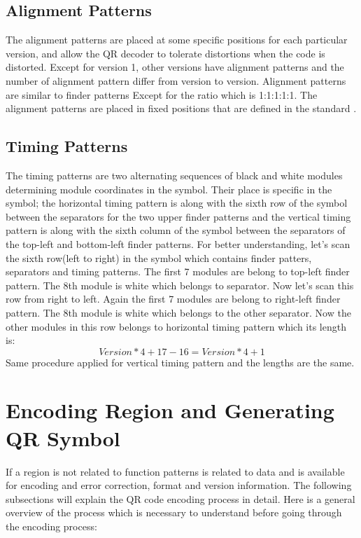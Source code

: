 \subsection{Alignment Patterns}

The alignment patterns are placed at some specific positions for each particular version, and allow the QR decoder to tolerate distortions when the code is distorted. Except for version 1, other versions have alignment patterns and the number of alignment pattern differ from version to version. Alignment patterns are similar to finder patterns Except for the ratio which is 1:1:1:1:1. The alignment patterns are placed in fixed positions that are defined in the standard \cite{1iso}.

\subsection{Timing Patterns}

The timing patterns are two alternating sequences of black and white modules determining module coordinates in the symbol. Their place is specific in the symbol; the horizontal timing pattern is along with the sixth row of the symbol
between the separators for the two upper finder patterns and the vertical timing pattern is along with the sixth column of the symbol between the separators of the top-left and bottom-left finder patterns. For better understanding, let's scan the sixth row(left to right) in the symbol which contains finder patters, separators and timing patterns. The first 7 modules are belong to top-left finder pattern. The 8th module is white which belongs to separator. Now let's scan this row from right to left. Again the first 7 modules are belong to right-left finder pattern. The 8th module is white which belongs to the other separator. Now the other modules in this row belongs to horizontal timing pattern which its length is:
$$Version*4+17-16=Version*4+1$$
Same procedure applied for vertical timing pattern and the lengths are the same.

\section{Encoding Region and Generating QR Symbol}\label{Encod}

If a region is not related to function patterns is related to data and is available for encoding and error correction, format and version information. The following subsections will explain the QR code encoding process in detail. Here is a general overview of the process which is necessary to understand before going through the encoding process\cite{Thonky}:

